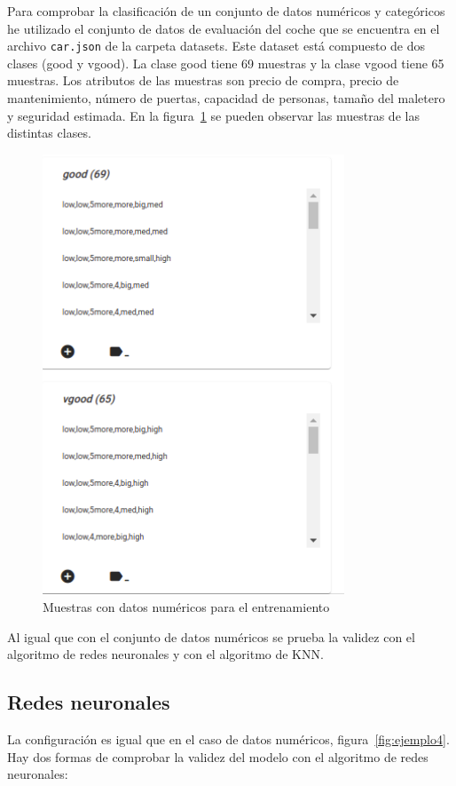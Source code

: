 \documentclass[a4paper, 12pt]{book}
\begin{document}
Para comprobar la clasificación de un conjunto de datos numéricos y categóricos he utilizado el conjunto de datos de evaluación del coche que se encuentra en el archivo \texttt{car.json} de la carpeta datasets. Este dataset está compuesto de dos clases (good y vgood). La clase good tiene 69 muestras y la clase vgood tiene 65 muestras.
Los atributos de las muestras son precio de compra, precio de mantenimiento, número de puertas, capacidad de personas, tamaño del maletero y seguridad estimada. 
En la figura~\ref{fig:ejemplo17} se pueden observar las muestras de las distintas clases.

\begin{figure}
	\centering
	\includegraphics[width=9cm, keepaspectratio]{img/ejemplo_muestras_numycat.png}
	\caption{Muestras con datos numéricos para el entrenamiento} 	\label{fig:ejemplo17}
\end{figure}

Al igual que con el conjunto de datos numéricos se prueba la validez con el algoritmo de redes neuronales y con el algoritmo de KNN.

\subsection{Redes neuronales}
\label{subsec:redesneuronales}

La configuración es igual que en el caso de datos numéricos, figura~\ref{fig:ejemplo4}.
Hay dos formas de comprobar la validez del modelo con el algoritmo de redes neuronales:
\end{document}
